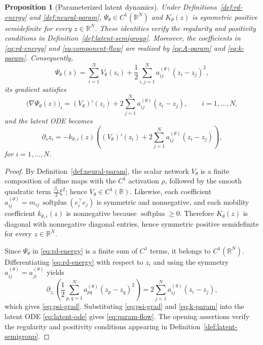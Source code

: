 \documentclass[11pt]{article}
\newtheorem{proposition}{Proposition}
\newcommand{\R}{\mathbb{R}}
\newcommand{\softplus}{\operatorname{softplus}}
\begin{document}
\begin{proposition}[Parameterized latent dynamics]\label{prop:param-dynamics}
Under Definitions~\ref{def:rd-energy} and \ref{def:neural-param}, \(\Psi_\theta\in C^1(\R^N)\) and \(K_\theta(z)\) is symmetric positive semidefinite for every \(z\in\R^N\). These identities verify the regularity and positivity conditions in Definition~\ref{def:latent-semigroup}. Moreover, the coefficients in \eqref{eq:rd-energy} and \eqref{eq:component-flow} are realized by \eqref{eq:A-param} and \eqref{eq:k-param}. Consequently,
\begin{equation}\label{eq:psi-param}
\Psi_{\theta}(z)=\sum_{i=1}^N V_{\theta}(z_i)+\frac12\sum_{i,j=1}^N a_{ij}^{(\theta)}(z_i-z_j)^2,
\end{equation}
its gradient satisfies
\begin{equation}\label{eq:psi-grad}
\bigl(\nabla\Psi_{\theta}(z)\bigr)_i=(V_{\theta})'(z_i)+2\sum_{j=1}^N a_{ij}^{(\theta)}(z_i-z_j), \qquad i=1,\dots,N,
\end{equation}
and the latent ODE becomes
\begin{equation}\label{eq:param-flow}
\partial_s z_i=-k_{\theta,i}(z)\left((V_{\theta})'(z_i)+2\sum_{j=1}^N a_{ij}^{(\theta)}(z_i-z_j)\right),
\end{equation}
for \(i=1,\dots,N\).
\end{proposition}

\begin{proof}
By Definition~\ref{def:neural-param}, the scalar network \(V_{\theta}\) is a finite composition of affine maps with the \(C^1\) activation \(\rho\), followed by the smooth quadratic term \(\frac{\beta_V}{2}\xi^2\); hence \(V_{\theta}\in C^1(\R)\). Likewise, each coefficient \(a_{ij}^{(\theta)}=m_{ij}\,\softplus(e_i^\top e_j)\) is symmetric and nonnegative, and each mobility coefficient \(k_{\theta,i}(z)\) is nonnegative because \(\softplus\ge 0\). Therefore \(K_{\theta}(z)\) is diagonal with nonnegative diagonal entries, hence symmetric positive semidefinite for every \(z\in \R^N\).

Since \(\Psi_{\theta}\) in \eqref{eq:rd-energy} is a finite sum of \(C^1\) terms, it belongs to \(C^1(\R^N)\). Differentiating \eqref{eq:rd-energy} with respect to \(z_i\) and using the symmetry \(a_{ij}^{(\theta)}=a_{ji}^{(\theta)}\) yields
\begin{equation*}
\partial_{z_i}\!\left(\frac12\sum_{p,q=1}^N a_{pq}^{(\theta)}(z_p-z_q)^2\right)=2\sum_{j=1}^N a_{ij}^{(\theta)}(z_i-z_j),
\end{equation*}
which gives \eqref{eq:psi-grad}. Substituting \eqref{eq:psi-grad} and \eqref{eq:k-param} into the latent ODE \eqref{eq:latent-ode} gives \eqref{eq:param-flow}. The opening assertions verify the regularity and positivity conditions appearing in Definition~\ref{def:latent-semigroup}.
\end{proof}
\end{document}
